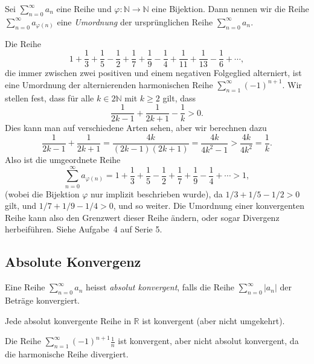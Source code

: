 \documentclass[../main.tex]{subfiles}
\begin{document}
\begin{definition}
  Sei $\sum_{n=0}^{\infty} a_n$ eine Reihe und
  $\varphi \colon \mathbb{N} \to \mathbb{N}$ eine
  Bijektion. Dann nennen wir die Reihe
  $\sum_{n=0}^{\infty} a_{\varphi(n)}$ eine
  \emph{Umordnung} der ursprünglichen
  Reihe $\sum_{n=0}^{\infty} a_n$.
\end{definition}

\begin{example}
  Die Reihe
  \[
    1 + \frac{1}{3} + \frac{1}{5} - \frac{1}{2}
    + \frac{1}{7} + \frac{1}{9} - \frac{1}{4}
    + \frac{1}{11} + \frac{1}{13} - \frac{1}{6}
    + \cdots,
  \]
  die immer zwischen zwei positiven und einem
  negativen Folgeglied alterniert,
  ist eine Umordnung der
  alternierenden harmonischen Reihe
  $\sum_{n=1}^{\infty} {(-1)}^{n+1}$.
  Wir stellen fest, dass für alle
  $k \in 2 \mathbb{N}$ mit $k \geq 2$ gilt,
  dass
  \[
    \frac{1}{2k-1} + \frac{1}{2k+1} - \frac{1}{k} > 0.
  \]
  Dies kann man auf verschiedene Arten sehen,
  aber wir berechnen dazu
  \[
    \frac{1}{2k-1} + \frac{1}{2k+1} = \frac{4k}{(2k-1)(2k+1)}
    = \frac{4k}{4k^2 - 1} > \frac{4k}{4k^2} = \frac{1}{k}.
  \]
  Also ist die umgeordnete Reihe
  \[
    \sum_{n=0}^{\infty} a_{\varphi(n)} = 
    1 + \frac{1}{3} + \frac{1}{5} - \frac{1}{2}
    + \frac{1}{7} + \frac{1}{9} - \frac{1}{4} + \cdots > 1,
  \]
  (wobei die Bijektion $\varphi$ nur implizit
  beschrieben wurde), da
  $1/3 + 1/5 - 1/2 > 0$ gilt, und $1/7 + 1/9 - 1/4 > 0$,
  und so weiter.
  Die Umordnung einer konvergenten Reihe kann also den
  Grenzwert dieser Reihe ändern,
  oder sogar Divergenz herbeiführen. Siehe Aufgabe~4
  auf Serie 5.
\end{example}

\subsection*{Absolute Konvergenz}
\begin{definition}
  Eine Reihe $\sum_{n=0}^{\infty} a_n$ heisst
  \emph{absolut konvergent}, falls die Reihe
  $\sum_{n=0}^{\infty} |a_n|$ der Beträge konvergiert.
\end{definition}

\begin{lemma*}
  Jede absolut konvergente Reihe in
  $\mathbb{R}$ ist konvergent (aber nicht umgekehrt).
\end{lemma*}

\begin{example}
  Die Reihe
  $\sum_{n=1}^{\infty} {(-1)}^{n+1}\frac{1}{n}$ 
  ist konvergent, aber
  nicht absolut konvergent, da die harmonische Reihe divergiert.
\end{example}
\end{document}
